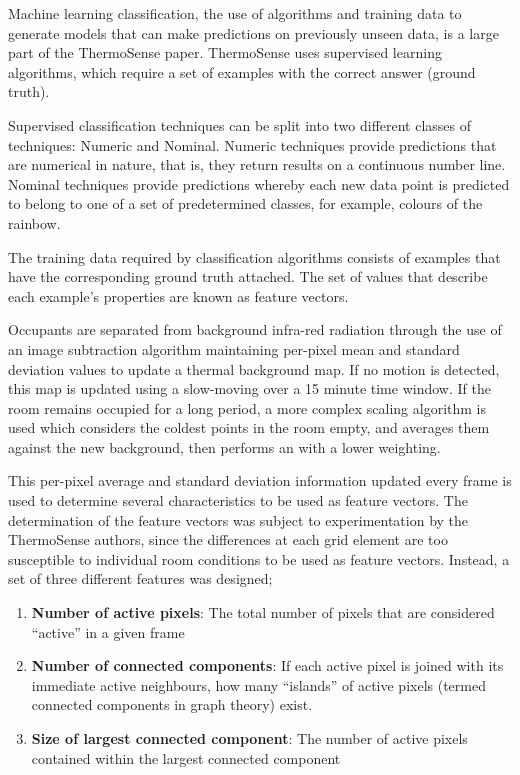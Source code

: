 \documentclass[../thesis/thesis.tex]{subfiles}
\begin{document}
Machine learning classification, the use of algorithms and training data to generate models that can make predictions on previously unseen data, is a large part of the ThermoSense paper. ThermoSense uses supervised learning algorithms, which require a set of examples with the correct answer (ground truth).

Supervised classification techniques can be split into two different classes of techniques: Numeric and Nominal. Numeric techniques provide predictions that are numerical in nature, that is, they return results on a continuous number line. Nominal techniques provide predictions whereby each new data point is predicted to belong to one of a set of predetermined classes, for example, colours of the rainbow.

The training data required by classification algorithms consists of examples that have the corresponding ground truth attached. The set of values that describe each example's properties are known as feature vectors.

Occupants are separated from background infra-red radiation through the use of an image subtraction algorithm maintaining per-pixel mean and standard deviation values to update a thermal background map. If no motion is detected, this map is updated using a slow-moving \emwa over a 15 minute time window. If the room remains occupied for a long period, a more complex scaling algorithm is used which considers the coldest points in the room empty, and averages them against the new background, then performs an \emwa with a lower weighting.

This per-pixel average and standard deviation information updated every frame is used to determine several characteristics to be used as feature vectors. The determination of the feature vectors was subject to experimentation by the ThermoSense authors, since the differences at each grid element are too susceptible to individual room conditions to be used as feature vectors. Instead, a set of three different features was designed;

\begin{enumerate}
\item \textbf{Number of active pixels}: The total number of pixels that are considered ``active'' in a given frame
\item \textbf{Number of connected components}: If each active pixel is joined with its immediate active neighbours, how many ``islands'' of active pixels (termed connected components in graph theory) exist.
\item \textbf{Size of largest connected component}: The number of active pixels contained within the largest connected component
\end{enumerate}
\end{document}
